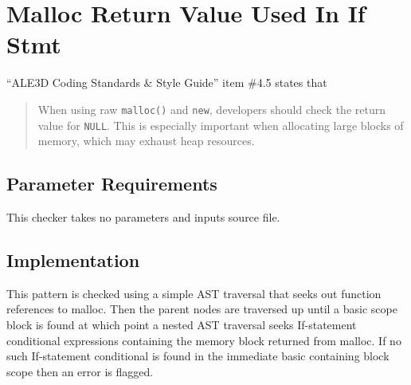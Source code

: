 %
%

\section{Malloc Return Value Used In If Stmt}
\label{MallocReturnValueUsedInIfStmt::overview}

``ALE3D Coding Standards \& Style Guide'' item \#4.5 states that
\begin{quote}
When using raw {\tt malloc()} and {\tt new}, developers should check the return value for {\tt NULL}. This is especially important when allocating large blocks of memory, which may exhaust heap resources.
\end{quote}

\subsection{Parameter Requirements}
This checker takes no parameters and inputs source file.

\subsection{Implementation}
This pattern is checked using a simple AST traversal that seeks out function references to malloc. Then the parent nodes are traversed up until a basic scope block is found at which point a nested AST traversal seeks If-statement conditional expressions containing the memory block returned from malloc. If no such If-statement conditional is found in the immediate basic containing block scope then an error is flagged.

